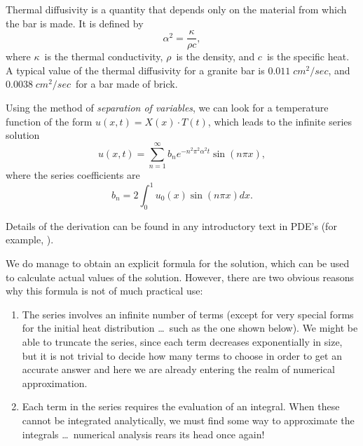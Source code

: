 \documentclass{article}
\begin{document}
{\begin{example}
\begin{itemize}
  \end{itemize}
\par Thermal diffusivity is a quantity that depends only on the
  material from which the bar is made.  It is defined by 
  \begin{displaymath}
  \alpha^2 = \frac{\kappa}{\rho c},
  \end{displaymath}
  where $\kappa$\  is the thermal conductivity, $\rho$\  is the density,
  and $c$\  is the specific heat.  A typical value of the thermal
  diffusivity for a granite 
  bar is $0.011\;cm^2/sec$, and $0.0038\;cm^2/sec$\  for a bar made of
  brick.  
\par Using the method of \emph{separation of variables}, we can look for a
  temperature function of the form $u(x,t)=X(x) \cdot T(t)$, which leads to
  the infinite series solution
  \begin{displaymath}
    u(x,t) = \sum_{n=1}^\infty b_n e^{-n^2\pi^2\alpha^2 t}\sin{(n\pi x)},
  \end{displaymath}
  where the series coefficients are
  \begin{displaymath}
    b_n = 2 \int_0^1 u_0(x) \sin{(n\pi x)} dx.
  \end{displaymath}
\par\begin{mathnote}
    Details of the derivation can be found in any introductory text in
    PDE's (for example, \cite[p.~549]{boyce-diprima}).  
  \end{mathnote}
\par We do manage to obtain an explicit formula for the solution, which can
  be used to calculate actual values of the solution.  However, there
  are two obvious reasons why this formula is not of much
  practical use:
  \begin{enumerate}
  \item The series involves an infinite number of terms (except for
    very special forms for the initial heat distribution \dots\ such as
    the one shown below).  
    We might be able to truncate the series, since each term
    decreases exponentially in size, but it is not trivial to decide
    how many terms to choose in order to get an accurate answer and 
    here we are already entering the realm of numerical
    approximation.  
  \item Each term in the series requires the evaluation of an
    integral.  When these cannot be integrated analytically, we must
    find some way to approximate the integrals \dots\ numerical
    analysis rears its head once again!

\end{enumerate}
\end{example}}
\end{document}
